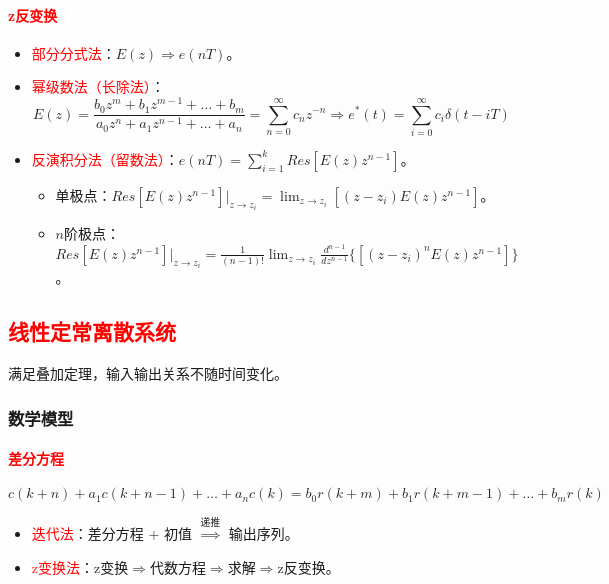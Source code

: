 \documentclass[
12pt, %
a4paper, 
oneside, %
]{scrartcl}
\begin{document}
\paragraph{\textcolor{red}{z反变换}}
\begin{itemize}
\item \textcolor{red}{部分分式法}：$ E(z) \Rightarrow e(nT) $。
\item \textcolor{red}{幂级数法（长除法）}：
$$ E(z) = \frac{b_0 z^m + b_1 z^{m - 1} + \dots +b_m}{a_0 z^n + a_1 z^{n - 1} + \dots +a_n} = \sum_{n = 0}^{\infty} c_n z^{-n} \Rightarrow e^*(t) = \sum_{i = 0}^{\infty} c_i \delta(t - iT) $$
\item \textcolor{red}{反演积分法（留数法）}：$ e(nT) = \sum_{i = 1}^k Res[E(z)z^{n - 1}] $。
\begin{itemize}
\item 单极点：$ Res[E(z)z^{n - 1}]|_{z \to z_i} = \lim_{z \to z_i}[(z - z_i)E(z) z^{n - 1}] $。
\item $ n $阶极点：$ Res[E(z)z^{n - 1}]|_{z \to z_i} = \frac{1}{(n - 1)!} \lim_{z \to z_i} \frac{d^{n - 1}}{d z^{n - 1}} \{[(z - z_i)^n E(z) z^{n - 1}]\} $。
\end{itemize}
\end{itemize}
\subsection[线性定常离散系统]{\textcolor{red}{线性定常离散系统}}
满足叠加定理，输入输出关系不随时间变化。
\subsubsection[数学模型]{数学模型}
\paragraph{\textcolor{red}{差分方程}}
$$ c(k + n) + a_1 c(k + n - 1) + \dots + a_n c(k) = b_0 r(k + m) + b_1 r(k + m - 1) + \dots + b_m r(k) $$
\begin{itemize}
\item \textcolor{red}{迭代法}：差分方程 + 初值 $ \overset{\text{递推}}{\Longrightarrow} $ 输出序列。
\item \textcolor{red}{z变换法}：z变换$ \Rightarrow $代数方程$ \Rightarrow $求解$ \Rightarrow $z反变换。
\end{itemize}
\end{document}

